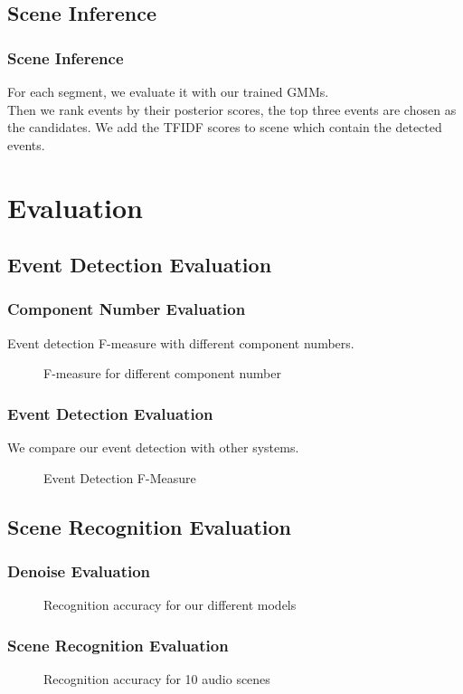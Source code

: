\documentclass[xcolor=table,slidestop,compress,mathserif]{beamer}
\begin{document}
\subsection{Scene Inference}
\begin{frame}
	\frametitle{Scene Inference}	
	For each segment, we evaluate it with our trained GMMs. \\ 
	Then we rank events by their posterior scores, the top three events are chosen as the candidates. 
	We add the TFIDF scores to scene which contain the detected events. 
\end{frame}
\section{Evaluation}
\subsection{Event Detection Evaluation}
\begin{frame}
	\frametitle{Component Number Evaluation}
	Event detection F-measure with different component numbers. \\ 	
	\begin{figure}[htb!]
	\centering
	\resizebox{0.8\totalheight}{!}{}
	\caption{F-measure for different component number}
	\label{fig:component}
	\end{figure}
\end{frame}
\begin{frame}
	\frametitle{Event Detection Evaluation}
	We compare our event detection with other systems. 	
	\begin{figure}[htb!]
	\centering
	\resizebox{0.8\totalheight}{!}{}
	\caption{Event Detection F-Measure}
	\label{fig:eventdetectF1}
	\end{figure}
\end{frame}
\subsection{Scene Recognition Evaluation}
\begin{frame}
	\frametitle{Denoise Evaluation}
	
	\begin{figure}[htb!]
	\centering
	\resizebox{0.8\totalheight}{!}{}
	\caption{Recognition accuracy for our different models}
	\label{fig:ourTuning}
	\end{figure}
\end{frame}
\begin{frame}
	\frametitle{Scene Recognition Evaluation}
	
	\begin{figure}[htb!]
	\centering
	\resizebox{0.8\totalheight}{!}{}
	\caption{Recognition accuracy for 10 audio scenes}
	\label{fig:sceneeval}
	\end{figure}
\end{frame}
\end{document}
